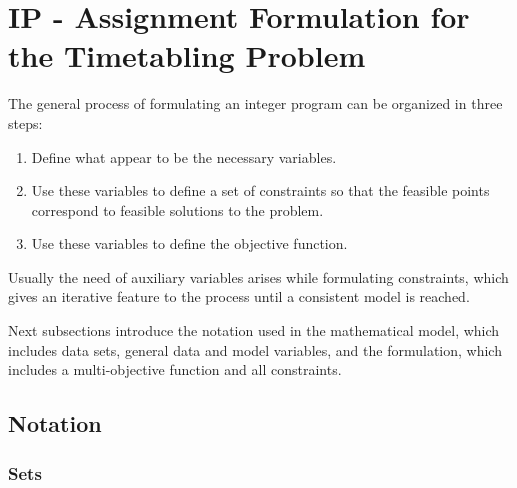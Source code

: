 \section{IP - Assignment Formulation for the Timetabling Problem}
\label{sec:mathForm}

The general process of formulating an integer program can be organized in three steps:

\begin{enumerate}
\item Define what appear to be the necessary variables.
\item Use these variables to define a set of constraints so that the feasible points correspond to feasible solutions to the problem.
\item Use these variables to define the objective function.
\end{enumerate}

Usually the need of auxiliary variables arises while formulating constraints, which gives an iterative feature to the process until a consistent model is reached.

Next subsections introduce the notation used in the mathematical model, which includes data sets, general data and model variables, and the formulation, which includes a multi-objective function and all constraints.


\subsection{Notation}

\subsubsection{Sets}

